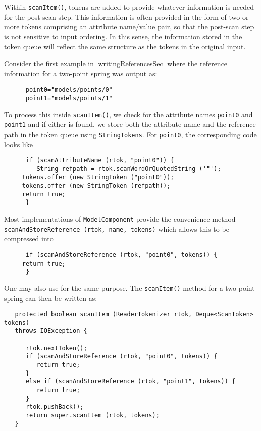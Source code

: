 \documentclass{article}
\begin{document}
Within {\tt scanItem()}, tokens are added to provide whatever
information is needed for the post-scan step.  This information is
often provided in the form of two or more tokens comprising an
attribute name/value pair, so that the post-scan step is not sensitive
to input ordering. In this sense, the information
stored in the token queue will reflect the same structure as the
tokens in the original input.

Consider the first example in \ref{writingReferencesSec}
where the reference information for a two-point spring was output as:
\begin{lstlisting}
      point0="models/points/0"
      point1="models/points/1"
\end{lstlisting}
To process this inside {\tt scanItem()}, we check for the attribute
names {\tt point0} and {\tt point1} and if either is found, we store both
the attribute name and the reference path in the token queue using
{\tt StringTokens}.  For {\tt point0}, the corresponding code
looks like
\begin{lstlisting}
      if (scanAttributeName (rtok, "point0")) {
         String refpath = rtok.scanWordOrQuotedString ('"');
	 tokens.offer (new StringToken ("point0"));
	 tokens.offer (new StringToken (refpath));
	 return true;
      }
\end{lstlisting}
Most implementations of {\tt ModelComponent}
provide the convenience method {\tt scanAndStoreReference (rtok, name, tokens)}
which allows this to be compressed into
\begin{lstlisting}
      if (scanAndStoreReference (rtok, "point0", tokens)) {
	 return true;
      }
\end{lstlisting}
One may also use
for the same purpose.
The {\tt scanItem()} method for a two-point spring can then be written as:
\begin{lstlisting}
   protected boolean scanItem (ReaderTokenizer rtok, Deque<ScanToken> tokens)
   throws IOException {

      rtok.nextToken();
      if (scanAndStoreReference (rtok, "point0", tokens)) {
         return true;
      }
      else if (scanAndStoreReference (rtok, "point1", tokens)) {
         return true;
      }
      rtok.pushBack();
      return super.scanItem (rtok, tokens);
   }
\end{lstlisting}
\end{document}
